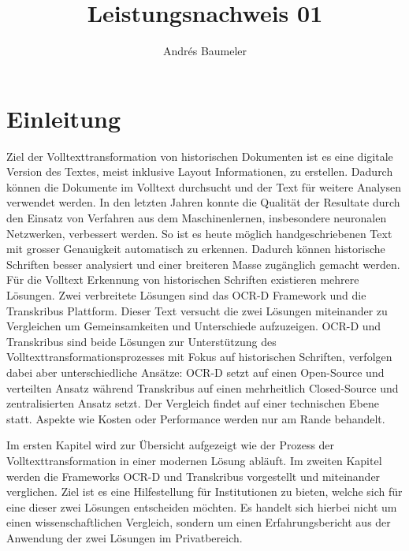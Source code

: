 \documentclass[a4paper,oneside, 12pt]{report}
\title{Leistungsnachweis 01}
\author{Andrés Baumeler}
\begin{document}

\pagestyle{empty} %





\cleardoublepage
\tableofcontents %
\cleardoublepage %

\pagestyle{plain} %



\chapter{Einleitung}\label{sec:motivation}
Ziel der Volltexttransformation von historischen Dokumenten ist es eine digitale Version des Textes, meist inklusive Layout Informationen, zu erstellen. Dadurch können die Dokumente im Volltext durchsucht und der Text für weitere Analysen verwendet werden. In den letzten Jahren konnte die Qualität der Resultate durch den Einsatz von Verfahren aus dem Maschinenlernen, insbesondere neuronalen Netzwerken, verbessert werden. So ist es heute möglich handgeschriebenen Text mit grosser Genauigkeit automatisch zu erkennen. Dadurch können historische Schriften besser analysiert und einer breiteren Masse zugänglich gemacht werden.
Für die Volltext Erkennung von historischen Schriften existieren mehrere Lösungen. Zwei verbreitete Lösungen sind das OCR-D Framework und die Transkribus Plattform. Dieser Text versucht die zwei Lösungen miteinander zu Vergleichen um Gemeinsamkeiten und Unterschiede aufzuzeigen. OCR-D und Transkribus sind beide Lösungen zur Unterstützung des Volltexttransformationsprozesses mit Fokus auf historischen Schriften, verfolgen dabei aber unterschiedliche Ansätze: OCR-D setzt auf einen Open-Source und verteilten Ansatz während Transkribus auf einen mehrheitlich Closed-Source und zentralisierten Ansatz setzt. Der Vergleich findet auf einer technischen Ebene statt. Aspekte wie Kosten oder Performance werden nur am Rande behandelt.

Im ersten Kapitel wird zur Übersicht aufgezeigt wie der Prozess der Volltexttransformation in einer modernen Lösung abläuft. Im zweiten Kapitel werden die Frameworks OCR-D und Transkribus vorgestellt und miteinander verglichen. Ziel ist es eine Hilfestellung für Institutionen zu bieten, welche sich für eine dieser zwei Lösungen entscheiden möchten. Es handelt sich hierbei nicht um einen wissenschaftlichen Vergleich, sondern um einen Erfahrungsbericht aus der Anwendung der zwei Lösungen im Privatbereich. 
\end{document}
